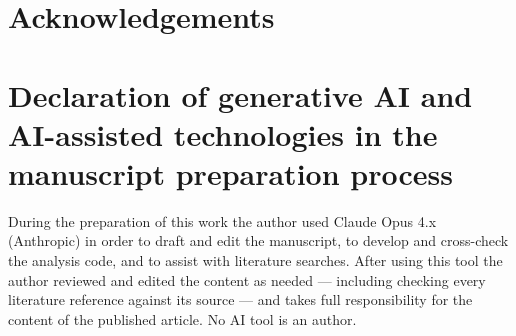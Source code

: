 \documentclass[preprint,12pt]{elsarticle}
\begin{document}
\section*{Acknowledgements}\label{acknowledgements}

\section{Declaration of generative AI and AI-assisted technologies in
the manuscript preparation
process}\label{declaration-of-generative-ai-and-ai-assisted-technologies-in-the-manuscript-preparation-process}

During the preparation of this work the author used Claude Opus 4.x
(Anthropic) in order to draft and edit the manuscript, to develop and
cross-check the analysis code, and to assist with literature searches.
After using this tool the author reviewed and edited the content as
needed --- including checking every literature reference against its
source --- and takes full responsibility for the content of the
published article. No AI tool is an author.



\end{document}
